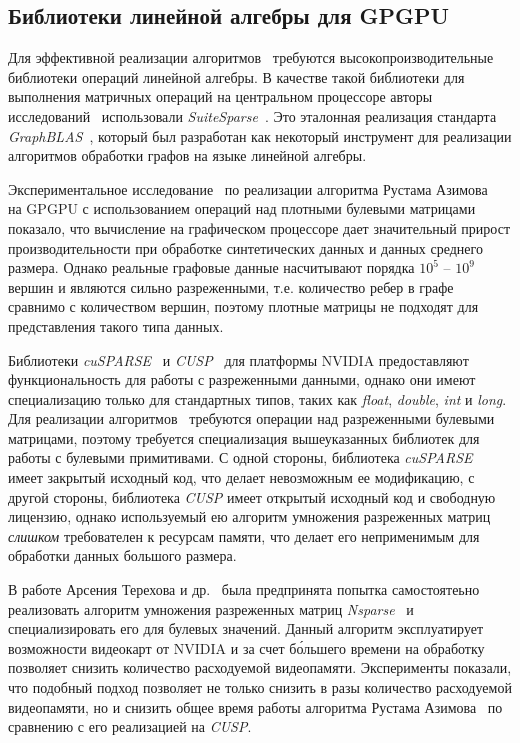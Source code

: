 \subsection{Библиотеки линейной алгебры для GPGPU}

Для эффективной реализации алгоритмов~\cite{inbook:kronecker_cfpq_adbis, inproceedings:matrix_cfpq} требуются высокопроизводительные библиотеки операций линейной алгебры. В качестве такой библиотеки для выполнения матричных операций на центральном процессоре авторы исследований~\cite{inbook:kronecker_cfpq_adbis, inproceedings:cfqp_matrix_with_single_source} использовали \textit{SuiteSparse}~\cite{article:suite_sparse_for_graph_problems,net:suite_sparse}. Это эталонная реализация стандарта \textit{GraphBLAS}~\cite{net:graphblas}, который был разработан как некоторый инструмент для реализации алгоритмов обработки графов на языке линейной алгебры.  

Экспериментальное исследование~\cite{inproceedings:cfpq_matrix_evaluation} по реализации алгоритма Рустама Азимова~\cite{inproceedings:matrix_cfpq} на GPGPU с использованием операций над плотными булевыми матрицами показало, что вычисление на графическом процессоре дает значительный прирост производительности при обработке синтетических данных и данных среднего размера. Однако реальные графовые данные насчитывают порядка $10^5$ -- $10^9$ вершин и являются сильно разреженными, т.е. количество ребер в графе сравнимо с количеством вершин, поэтому плотные матрицы не подходят для представления такого типа данных. 

Библиотеки \textit{cuSPARSE}~\cite{net:cusparse_docs} и \textit{CUSP}~\cite{net:cusplibrary} для платформы NVIDIA предоставляют функциональность для работы с разреженными данными, однако они имеют специализацию только для стандартных типов, таких как \textit{float}, \textit{double}, \textit{int} и \textit{long}. Для реализации алгоритмов~\cite{inbook:kronecker_cfpq_adbis, inproceedings:matrix_cfpq} требуются операции над разреженными булевыми матрицами, поэтому требуется специализация вышеуказанных библиотек для работы с булевыми примитивами. С одной стороны, библиотека \textit{cuSPARSE} имеет закрытый исходный код, что делает невозможным ее модификацию, с другой стороны, библиотека \textit{CUSP} имеет открытый исходный код и свободную лицензию, однако используемый ею алгоритм умножения разреженных матриц \textit{слишком} требователен к ресурсам памяти, что делает его неприменимым для обработки данных большого размера.

В работе Арсения Терехова и др.~\cite{inproceedings:cfqp_matrix_with_single_source} была предпринята попытка самостоятеьно реализовать алгоритм умножения разреженных матриц \textit{Nsparse}~\cite{inproceedings:spgemm_mem_saving_for_nvidia} и специализировать его для булевых значений. Данный алгоритм эксплуатирует возможности  видеокарт от NVIDIA и за счет б\'ольшего времени на обработку позволяет снизить количество расходуемой видеопамяти. Эксперименты показали, что подобный подход позволяет не только снизить в разы количество расходуемой видеопамяти, но и снизить общее время работы алгоритма Рустама Азимова~\cite{inproceedings:matrix_cfpq} по сравнению с его реализацией на \textit{CUSP}. 

